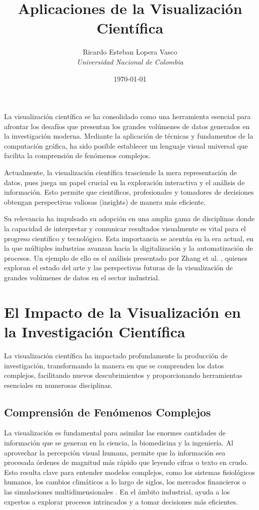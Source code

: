 \documentclass[12pt,a4paper]{article}
\title{\textbf{Aplicaciones de la Visualización Científica}}
\author{Ricardo Esteban Lopera Vasco \\
\textit{Universidad Nacional de Colombia}}
\date{\today}
\begin{document}
\maketitle


La visualización científica se ha consolidado como una herramienta esencial para afrontar los desafíos que presentan los grandes volúmenes de datos generados en la investigación moderna. Mediante la aplicación de técnicas y fundamentos de la computación gráfica, ha sido posible establecer un lenguaje visual universal que facilita la comprensión de fenómenos complejos.

Actualmente, la visualización científica trasciende la mera representación de datos, pues juega un papel crucial en la exploración interactiva y el análisis de información. Esto permite que científicos, profesionales y tomadores de decisiones obtengan perspectivas valiosas (insights) de manera más eficiente.

Su relevancia ha impulsado su adopción en una amplia gama de disciplinas donde la capacidad de interpretar y comunicar resultados visualmente es vital para el progreso científico y tecnológico. Esta importancia se acentúa en la era actual, en la que múltiples industrias avanzan hacia la digitalización y la automatización de procesos. Un ejemplo de ello es el análisis presentado por Zhang et al. \cite{ZHANG2025}, quienes exploran el estado del arte y las perspectivas futuras de la visualización de grandes volúmenes de datos en el sector industrial.


\section*{El Impacto de la Visualización en la Investigación Científica}

La visualización científica ha impactado profundamente la producción de investigación, transformando la manera en que se comprenden los datos complejos, facilitando nuevos descubrimientos y proporcionando herramientas esenciales en numerosas disciplinas.

\subsection*{Comprensión de Fenómenos Complejos}
La visualización es fundamental para asimilar las enormes cantidades de información que se generan en la ciencia, la biomedicina y la ingeniería. Al aprovechar la percepción visual humana, permite que la información sea procesada órdenes de magnitud más rápido que leyendo cifras o texto en crudo. Esto resulta clave para entender modelos complejos, como los sistemas fisiológicos humanos, los cambios climáticos a lo largo de siglos, los mercados financieros o las simulaciones multidimensionales \cite{Moorhead2006}. En el ámbito industrial, ayuda a los expertos a explorar procesos intrincados y a tomar decisiones más eficientes.
\end{document}

